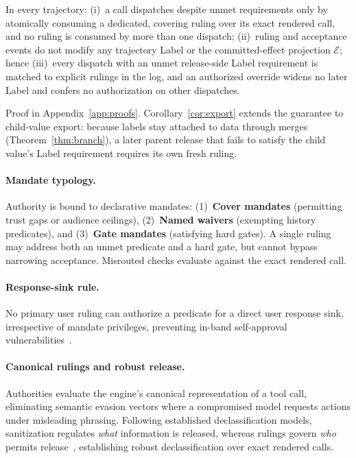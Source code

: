 \begin{theorem}\label{thm:release}
In every trajectory: (i)~a call dispatches despite unmet requirements only by atomically consuming a dedicated, covering ruling over its exact rendered call, and no ruling is consumed by more than one dispatch; (ii)~ruling and acceptance events do not modify any trajectory Label or the committed-effect projection $\mathcal{E}$; hence (iii)~every dispatch with an unmet release-side Label requirement is matched to explicit rulings in the log, and an authorized override widens no later Label and confers no authorization on other dispatches.
\end{theorem}
Proof in Appendix~\ref{app:proofs}. Corollary~\ref{cor:export} extends the guarantee to child-value export: because labels stay attached to data through merges (Theorem~\ref{thm:branch}), a later parent release that fails to satisfy the child value's Label requirement requires its own fresh ruling.

\paragraph{Mandate typology.}
Authority is bound to declarative mandates: (1)~\textbf{Cover mandates} (permitting trust gaps or audience ceilings), (2)~\textbf{Named waivers} (exempting history predicates), and (3)~\textbf{Gate mandates} (satisfying hard gates). A single ruling may address both an unmet predicate and a hard gate, but cannot bypass narrowing acceptance. Misrouted checks evaluate against the exact rendered call.

\paragraph{Response-sink rule.}
No primary user ruling can authorize a predicate for a direct user response sink, irrespective of mandate privileges, preventing in-band self-approval vulnerabilities~\cite{saltzer1975protection}.

\paragraph{Canonical rulings and robust release.}
Authorities evaluate the engine's canonical representation of a tool call, eliminating semantic evasion vectors where a compromised model requests actions under misleading phrasing. Following established declassification models, sanitization regulates \emph{what} information is released, whereas rulings govern \emph{who} permits release~\cite{sabelfeld2009declassification,zdancewic2001robust}, establishing robust declassification over exact rendered calls.

